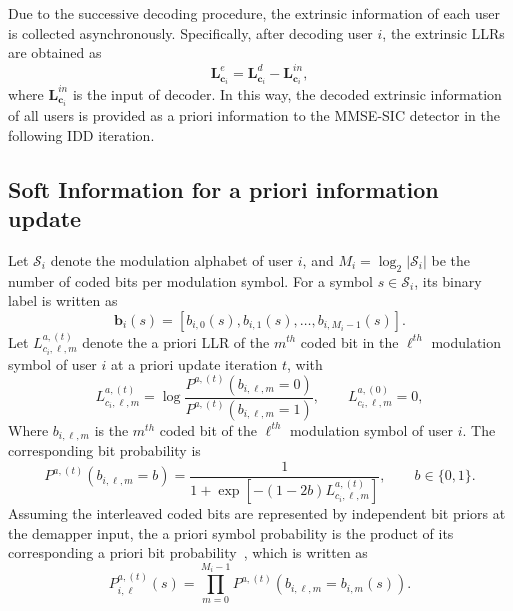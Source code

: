 Due to the successive decoding procedure, the extrinsic information of each user is collected asynchronously. Specifically, after decoding user $i$, the extrinsic LLRs are obtained as
\begin{equation}
    \label{eq:extrinsic LLR for next a priori update}
    \bm{L}^e_{\bm{c}_i} = \bm{L}^d_{\bm{c}_i} - \bm{L}^{in}_{\bm{c}_i},
\end{equation}
where $\bm{L}^{in}_{\bm{c}_i}$ is the input of decoder.
In this way, the decoded extrinsic information of all users is provided as a priori information to the MMSE-SIC detector in the following IDD iteration.

\subsection{Soft Information for a priori information update}
\label{sec:Soft Information for a priori update}
Let $\mathcal{S}_i$ denote the modulation alphabet of user $i$, and $M_i=\log_2|\mathcal{S}_i|$ be the number of coded bits per modulation symbol. For a symbol
$s\in\mathcal{S}_i$, its binary label is written as
\begin{equation}
    \bm{b}_i(s)
    =
    [b_{i,0}(s),b_{i,1}(s),\ldots,b_{i,M_i-1}(s)] .
\end{equation}
Let $L^{a,(t)}_{c_{i},\ell,m}$ denote the a priori LLR of the $m^{th}$ coded bit in the $\ell^{th}$ modulation symbol of user $i$ at a priori update iteration $t$, with
\begin{equation}
    \label{eq:a priori LLR}
    L^{a,(t)}_{c_{i},\ell,m}
    =
    \log
    \frac{P^{a,(t)}(b_{i,\ell,m}=0)}
    {P^{a,(t)}(b_{i,\ell,m}=1)},
    \qquad
    L^{a,(0)}_{c_{i},\ell,m} = 0,
\end{equation}
Where $b_{i,\ell,m}$ is the $m^{th}$ coded bit of the $\ell^{th}$ modulation symbol of user $i$.
The corresponding bit probability is
\begin{equation}
    P^{a,(t)}(b_{i,\ell,m}=b)
    =
    \frac{1}
    {1+\exp\left[-(1-2b)L^{a,(t)}_{c_{i},\ell,m}\right]},
    \qquad b\in\{0,1\}.
    \label{eq:bit-prior-from-llr}
\end{equation}
Assuming the interleaved coded bits are represented by independent bit priors at the demapper input, the a priori symbol probability is the product of its corresponding a priori bit probability~\cite{tuchler2002minimum}, which is written as
\begin{equation}
    P^{a,(t)}_{i,\ell}(s)
    =
    \prod_{m=0}^{M_i-1}
    P^{a,(t)}(b_{i,\ell,m}=b_{i,m}(s)).
    \label{eq:symbol-prior-from-bit-priors}
\end{equation}

